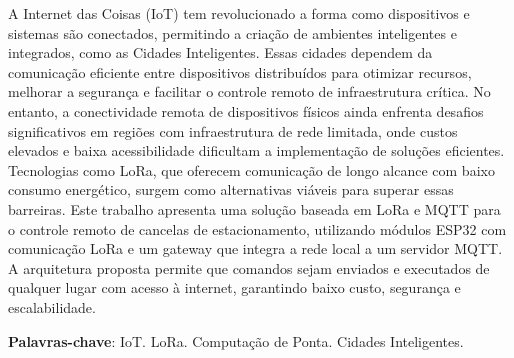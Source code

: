 \documentclass[
article,			%
11pt,				%
twoside,			%
a4paper,			%
section=TITLE,		%
onecolumn,          %
english,			%
brazil,				%
sumario=tradicional
]{abntex2}
\begin{document}

\begin{resumo}
    A Internet das Coisas (IoT) tem revolucionado a forma como dispositivos e sistemas são conectados, permitindo a criação de ambientes inteligentes e integrados, como as Cidades Inteligentes. Essas cidades dependem da comunicação eficiente entre dispositivos distribuídos para otimizar recursos, melhorar a segurança e facilitar o controle remoto de infraestrutura crítica. No entanto, a conectividade remota de dispositivos físicos ainda enfrenta desafios significativos em regiões com infraestrutura de rede limitada, onde custos elevados e baixa acessibilidade dificultam a implementação de soluções eficientes. Tecnologias como LoRa, que oferecem comunicação de longo alcance com baixo consumo energético, surgem como alternativas viáveis para superar essas barreiras. Este trabalho apresenta uma solução baseada em LoRa e MQTT para o controle remoto de cancelas de estacionamento, utilizando módulos ESP32 com comunicação LoRa e um gateway que integra a rede local a um servidor MQTT. A arquitetura proposta permite que comandos sejam enviados e executados de qualquer lugar com acesso à internet, garantindo baixo custo, segurança e escalabilidade.

    \noindent
    \textbf{Palavras-chave}: IoT. LoRa. Computação de Ponta. Cidades Inteligentes.
\end{resumo}
    
\end{document}
